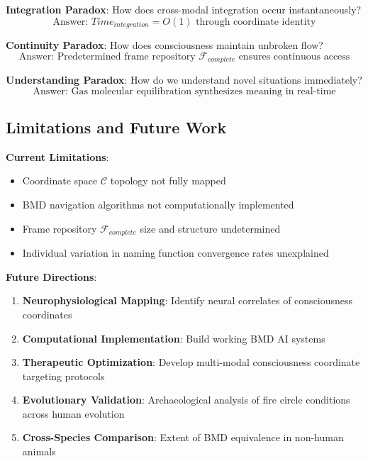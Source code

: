 \documentclass[12pt]{article}
\theoremstyle{definition}
\theoremstyle{remark}
\begin{document}
\textbf{Integration Paradox}: How does cross-modal integration occur instantaneously?
\begin{equation}
\text{Answer: } Time_{integration} = O(1) \text{ through coordinate identity}
\end{equation}

\textbf{Continuity Paradox}: How does consciousness maintain unbroken flow?
\begin{equation}
\text{Answer: Predetermined frame repository } \mathcal{F}_{complete} \text{ ensures continuous access}
\end{equation}

\textbf{Understanding Paradox}: How do we understand novel situations immediately?
\begin{equation}
\text{Answer: Gas molecular equilibration synthesizes meaning in real-time}
\end{equation}

\subsection{Limitations and Future Work}

\textbf{Current Limitations}:
\begin{itemize}
\item Coordinate space $\mathcal{C}$ topology not fully mapped
\item BMD navigation algorithms not computationally implemented
\item Frame repository $\mathcal{F}_{complete}$ size and structure undetermined
\item Individual variation in naming function convergence rates unexplained
\end{itemize}

\textbf{Future Directions}:
\begin{enumerate}
\item \textbf{Neurophysiological Mapping}: Identify neural correlates of consciousness coordinates
\item \textbf{Computational Implementation}: Build working BMD AI systems
\item \textbf{Therapeutic Optimization}: Develop multi-modal consciousness coordinate targeting protocols
\item \textbf{Evolutionary Validation}: Archaeological analysis of fire circle conditions across human evolution
\item \textbf{Cross-Species Comparison}: Extent of BMD equivalence in non-human animals
\end{enumerate}
\end{document}
